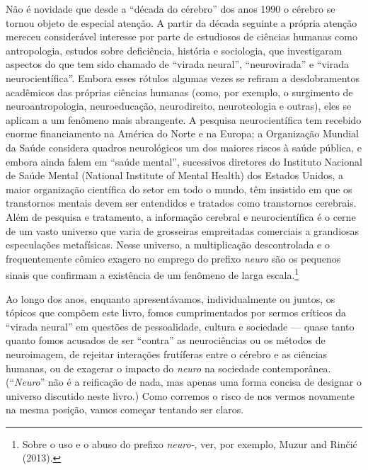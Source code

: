 Não é novidade que desde a ``década do cérebro'' dos anos 1990 o cérebro
se tornou objeto de especial atenção. A partir da década seguinte a
própria atenção mereceu considerável interesse por parte de estudiosos
de ciências humanas como antropologia, estudos sobre deficiência,
história e sociologia, que investigaram aspectos do que tem sido chamado
de ``virada neural'', ``neurovirada'' e ``virada neurocientífica''.
Embora esses rótulos algumas vezes se refiram a desdobramentos
acadêmicos das próprias ciências humanas (como, por exemplo, o
surgimento de neuroantropologia, neuroeducação, neurodireito,
neuroteologia e outras), eles se aplicam a um fenômeno mais abrangente.
A pesquisa neurocientífica tem recebido enorme financiamento na América
do Norte e na Europa; a Organização Mundial da Saúde considera quadros
neurológicos um dos maiores riscos à saúde pública, e embora ainda falem
em ``saúde mental'', sucessivos diretores do Instituto Nacional de Saúde
Mental (National Institute of Mental Health) dos Estados Unidos, a maior
organização científica do setor em todo o mundo, têm insistido em que os
transtornos mentais devem ser entendidos e tratados como transtornos
cerebrais. Além de pesquisa e tratamento, a informação cerebral e
neurocientífica é o cerne de um vasto universo que varia de grosseiras
empreitadas comerciais a grandiosas especulações metafísicas. Nesse
universo, a multiplicação descontrolada e o frequentemente cômico
exagero no emprego do prefixo \emph{neuro} são os pequenos sinais que
confirmam a existência de um fenômeno de larga
escala.\footnote[1]{Sobre o uso e o abuso do prefixo \emph{neuro-}, ver, por exemplo,
Muzur and Rinčić (2013).}

Ao longo dos anos, enquanto apresentávamos, individualmente ou juntos,
os tópicos que compõem este livro, fomos cumprimentados por sermos
críticos da ``virada neural'' em questões de pessoalidade, cultura e
sociedade --- quase tanto quanto fomos acusados de ser ``contra'' as
neurociências ou os métodos de neuroimagem, de rejeitar interações
frutíferas entre o cérebro e as ciências humanas, ou de exagerar o
impacto do \emph{neuro} na sociedade contemporânea. (``\emph{Neuro}''
não é a reificação de nada, mas apenas uma forma concisa de designar o
universo discutido neste livro.) Como corremos o risco de nos vermos
novamente na mesma posição, vamos começar tentando ser claros.

